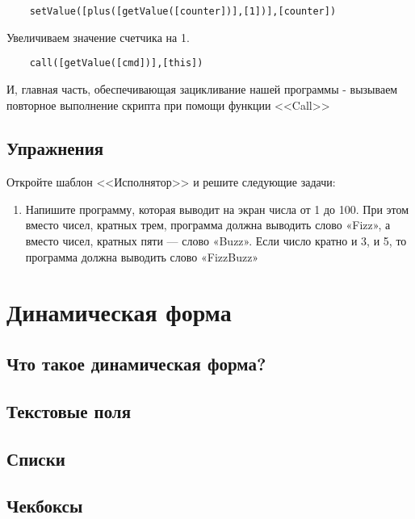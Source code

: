 \documentclass[10pt]{book}
\begin{document}
	\begin{verbatim}
	setValue([plus([getValue([counter])],[1])],[counter])
	\end{verbatim}
	
	Увеличиваем значение счетчика на 1.
	
	\begin{verbatim}
	call([getValue([cmd])],[this])
	\end{verbatim}
	
	И, главная часть, обеспечивающая зацикливание нашей программы - вызываем повторное выполнение скрипта при помощи функции
	<<Call>>
	
	\section{Упражнения}
	
	Откройте шаблон <<Исполнятор>> и решите следующие задачи:
	
	\begin{enumerate}
	\item Напишите программу, которая выводит на экран числа от 1 до 100. При этом вместо чисел, кратных трем, программа должна выводить слово «Fizz», а вместо чисел, кратных пяти — слово «Buzz». Если число кратно и 3, и 5, то программа должна выводить слово «FizzBuzz»
	
	\end{enumerate}
	
	\chapter{Динамическая форма}
	
	\section{Что такое динамическая форма?}
	
	\section{Текстовые поля}
	
	\section{Списки}
	
	\section{Чекбоксы}
	
\end{document}

